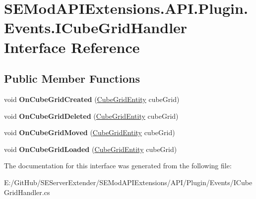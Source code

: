 \hypertarget{interface_s_e_mod_a_p_i_extensions_1_1_a_p_i_1_1_plugin_1_1_events_1_1_i_cube_grid_handler}{}\section{S\+E\+Mod\+A\+P\+I\+Extensions.\+A\+P\+I.\+Plugin.\+Events.\+I\+Cube\+Grid\+Handler Interface Reference}
\label{interface_s_e_mod_a_p_i_extensions_1_1_a_p_i_1_1_plugin_1_1_events_1_1_i_cube_grid_handler}
\subsection*{Public Member Functions}
\begin{DoxyCompactItemize}
\item 
\hypertarget{interface_s_e_mod_a_p_i_extensions_1_1_a_p_i_1_1_plugin_1_1_events_1_1_i_cube_grid_handler_ac8aaa7a07bc561e64e423b360d1d8e1d}{}void {\bfseries On\+Cube\+Grid\+Created} (\hyperlink{class_s_e_mod_a_p_i_internal_1_1_a_p_i_1_1_entity_1_1_sector_1_1_sector_object_1_1_cube_grid_entity}{Cube\+Grid\+Entity} cube\+Grid)\label{interface_s_e_mod_a_p_i_extensions_1_1_a_p_i_1_1_plugin_1_1_events_1_1_i_cube_grid_handler_ac8aaa7a07bc561e64e423b360d1d8e1d}

\item 
\hypertarget{interface_s_e_mod_a_p_i_extensions_1_1_a_p_i_1_1_plugin_1_1_events_1_1_i_cube_grid_handler_abde0887ee65d2217f01080c26792bd21}{}void {\bfseries On\+Cube\+Grid\+Deleted} (\hyperlink{class_s_e_mod_a_p_i_internal_1_1_a_p_i_1_1_entity_1_1_sector_1_1_sector_object_1_1_cube_grid_entity}{Cube\+Grid\+Entity} cube\+Grid)\label{interface_s_e_mod_a_p_i_extensions_1_1_a_p_i_1_1_plugin_1_1_events_1_1_i_cube_grid_handler_abde0887ee65d2217f01080c26792bd21}

\item 
\hypertarget{interface_s_e_mod_a_p_i_extensions_1_1_a_p_i_1_1_plugin_1_1_events_1_1_i_cube_grid_handler_aa508f9a8b09c09a7d67a8e783bb2adb4}{}void {\bfseries On\+Cube\+Grid\+Moved} (\hyperlink{class_s_e_mod_a_p_i_internal_1_1_a_p_i_1_1_entity_1_1_sector_1_1_sector_object_1_1_cube_grid_entity}{Cube\+Grid\+Entity} cube\+Grid)\label{interface_s_e_mod_a_p_i_extensions_1_1_a_p_i_1_1_plugin_1_1_events_1_1_i_cube_grid_handler_aa508f9a8b09c09a7d67a8e783bb2adb4}

\item 
\hypertarget{interface_s_e_mod_a_p_i_extensions_1_1_a_p_i_1_1_plugin_1_1_events_1_1_i_cube_grid_handler_a77b03f7154a5f00f44f2c059d3981b5b}{}void {\bfseries On\+Cube\+Grid\+Loaded} (\hyperlink{class_s_e_mod_a_p_i_internal_1_1_a_p_i_1_1_entity_1_1_sector_1_1_sector_object_1_1_cube_grid_entity}{Cube\+Grid\+Entity} cube\+Grid)\label{interface_s_e_mod_a_p_i_extensions_1_1_a_p_i_1_1_plugin_1_1_events_1_1_i_cube_grid_handler_a77b03f7154a5f00f44f2c059d3981b5b}

\end{DoxyCompactItemize}


The documentation for this interface was generated from the following file\+:\begin{DoxyCompactItemize}
\item 
E\+:/\+Git\+Hub/\+S\+E\+Server\+Extender/\+S\+E\+Mod\+A\+P\+I\+Extensions/\+A\+P\+I/\+Plugin/\+Events/I\+Cube\+Grid\+Handler.\+cs\end{DoxyCompactItemize}
